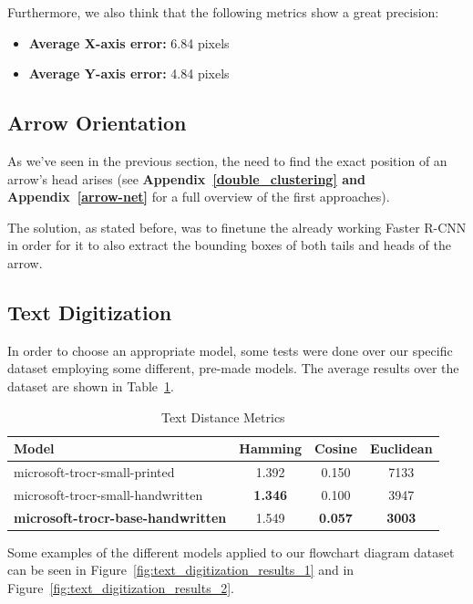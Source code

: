 \documentclass[conference]{IEEEtran}
\begin{document}
Furthermore, we also think that the following metrics show a great precision:

\begin{itemize}
	\item \textbf{Average X-axis error:} 6.84 pixels
	\item \textbf{Average Y-axis error:} 4.84 pixels
\end{itemize}


\subsection{Arrow Orientation}
\label{exp:arrow_orientation}
As we've seen in the previous section, the need to find the exact position of an arrow's head arises (see \textbf{Appendix~\ref{double_clustering} and \textbf{Appendix}~\ref{arrow-net}} for a full overview of the first approaches).

The solution, as stated before, was to finetune the already working Faster R-CNN in order for it to also extract the bounding boxes of both tails and heads of the arrow.

\subsection{Text Digitization}
In order to choose an appropriate model, some tests were done over our specific dataset employing some different, pre-made models. The average results over the dataset are shown in Table~\ref{tab:text_digitization}.

\begin{table}[htbp]
\caption{Text Distance Metrics}
\centering
\begin{tabular}{lccc}
\hline
\textbf{Model} & \textbf{Hamming} & \textbf{Cosine} & \textbf{Euclidean} \\
\hline
microsoft-trocr-small-printed & 1.392 & 0.150 & 7133 \\
microsoft-trocr-small-handwritten & \textbf{1.346} & 0.100  & 3947 \\ 
\hline 
\textbf{microsoft-trocr-base-handwritten} & 1.549 & \textbf{0.057} & \textbf{3003} \\
\hline
\end{tabular}
\label{tab:text_digitization}
\end{table}

Some examples of the different models applied to our flowchart diagram dataset can be seen in Figure~\ref{fig:text_digitization_results_1} and in Figure~\ref{fig:text_digitization_results_2}.
\end{document}
